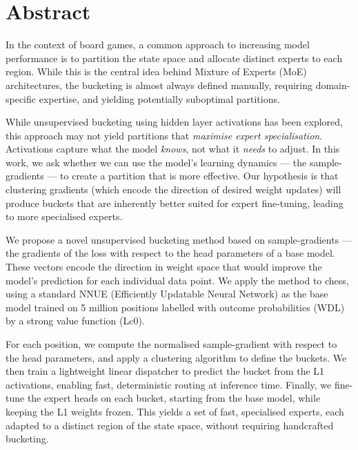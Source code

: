 \chapter{Abstract}\label{ch:abstract}

In the context of board games, a common approach to increasing model performance is to partition the state space and allocate distinct experts to each region. While this is the central idea behind Mixture of Experts (MoE) architectures, the bucketing is almost always defined manually, requiring domain-specific expertise, and yielding potentially suboptimal partitions.

While unsupervised bucketing using hidden layer activations has been explored, this approach may not yield partitions that \emph{maximise expert specialisation}. Activations capture what the model \emph{knows}, not what it \emph{needs} to adjust. In this work, we ask whether we can use the model's learning dynamics --- the sample-gradients --- to create a partition that is more effective. Our hypothesis is that clustering gradients (which encode the direction of desired weight updates) will produce buckets that are inherently better suited for expert fine-tuning, leading to more specialised experts.

We propose a novel unsupervised bucketing method based on sample-gradients --- the gradients of the loss with respect to the head parameters of a base model. These vectors encode the direction in weight space that would improve the model's prediction for each individual data point. We apply the method to chess, using a standard NNUE (Efficiently Updatable Neural Network) as the base model trained on 5 million positions labelled with outcome probabilities (WDL) by a strong value function (Lc0).

For each position, we compute the normalised sample-gradient with respect to the head parameters, and apply a clustering algorithm to define the buckets. We then train a lightweight linear dispatcher to predict the bucket from the L1 activations, enabling fast, deterministic routing at inference time. Finally, we fine-tune the expert heads on each bucket, starting from the base model, while keeping the L1 weights frozen. This yields a set of fast, specialised experts, each adapted to a distinct region of the state space, without requiring handcrafted bucketing.
